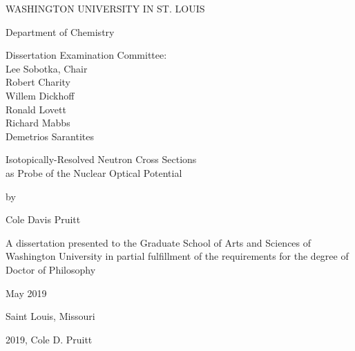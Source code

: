 \begin{titlepage}
    \begin{singlespace}
        \begin{center}
            \vspace*{1cm}

            WASHINGTON UNIVERSITY IN ST. LOUIS

            \vspace{0.5cm}
            Department of Chemistry

            \vspace{1.5cm}

            Dissertation Examination Committee:\\
            Lee Sobotka, Chair\\
            Robert Charity\\
            Willem Dickhoff\\ 
            Ronald Lovett\\
            Richard Mabbs\\
            Demetrios Sarantites\\

            \vspace{1.5 cm}

            Isotopically-Resolved Neutron Cross Sections\\
            as Probe of the Nuclear Optical Potential

            \vspace{0.5 cm}

            by

            \vspace{0.5 cm}

            Cole Davis Pruitt

            \vfill

            A dissertation presented to the Graduate School of Arts and Sciences of Washington University in partial fulfillment of the requirements for the degree of Doctor of Philosophy

            \vspace{0.8cm}

            May 2019

            \vspace{0.5 cm}
            Saint Louis, Missouri

        \end{center}
    \end{singlespace}
\end{titlepage}

\clearpage

\vspace*{\fill}
\begin{center}    
    \textcopyright \hspace{2pt} 2019, Cole D. Pruitt
\end{center}
\vspace*{\fill}

\thispagestyle{empty} %
\addtocounter{page}{-1}%
\clearpage
